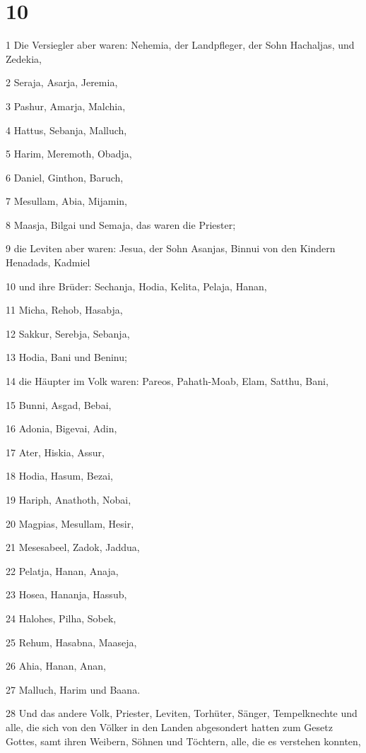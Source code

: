 \chapter{10}

\par 1 Die Versiegler aber waren: Nehemia, der Landpfleger, der Sohn Hachaljas, und Zedekia,
\par 2 Seraja, Asarja, Jeremia,
\par 3 Pashur, Amarja, Malchia,
\par 4 Hattus, Sebanja, Malluch,
\par 5 Harim, Meremoth, Obadja,
\par 6 Daniel, Ginthon, Baruch,
\par 7 Mesullam, Abia, Mijamin,
\par 8 Maasja, Bilgai und Semaja, das waren die Priester;
\par 9 die Leviten aber waren: Jesua, der Sohn Asanjas, Binnui von den Kindern Henadads, Kadmiel
\par 10 und ihre Brüder: Sechanja, Hodia, Kelita, Pelaja, Hanan,
\par 11 Micha, Rehob, Hasabja,
\par 12 Sakkur, Serebja, Sebanja,
\par 13 Hodia, Bani und Beninu;
\par 14 die Häupter im Volk waren: Pareos, Pahath-Moab, Elam, Satthu, Bani,
\par 15 Bunni, Asgad, Bebai,
\par 16 Adonia, Bigevai, Adin,
\par 17 Ater, Hiskia, Assur,
\par 18 Hodia, Hasum, Bezai,
\par 19 Hariph, Anathoth, Nobai,
\par 20 Magpias, Mesullam, Hesir,
\par 21 Mesesabeel, Zadok, Jaddua,
\par 22 Pelatja, Hanan, Anaja,
\par 23 Hosea, Hananja, Hassub,
\par 24 Halohes, Pilha, Sobek,
\par 25 Rehum, Hasabna, Maaseja,
\par 26 Ahia, Hanan, Anan,
\par 27 Malluch, Harim und Baana.
\par 28 Und das andere Volk, Priester, Leviten, Torhüter, Sänger, Tempelknechte und alle, die sich von den Völker in den Landen abgesondert hatten zum Gesetz Gottes, samt ihren Weibern, Söhnen und Töchtern, alle, die es verstehen konnten,
